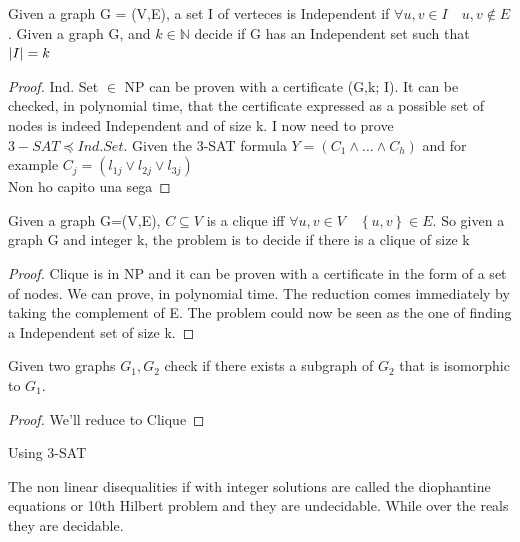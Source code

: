 \begin{proposition}
    Given a graph G = (V,E), a set I of verteces is Independent if 
    $\forall u,v \in I \quad {u,v} \notin E$. Given a graph G, and $k \in \mathbb{N}$ decide if G has an Independent set such that $\left\lvert I\right\rvert = k$
    \begin{proof}
        Ind. Set $\in$ NP can be proven with a certificate (G,k; I). It can be checked, in polynomial time, that the certificate expressed as a possible set of nodes is indeed Independent and of size k. I now need to prove $3-SAT \preceq Ind.Set$. Given the 3-SAT formula $Y  = (C_1 \wedge \ldots \wedge C_h)$ and for example $C_j = (l_{1j} \vee l_{2j} \vee l_{3j})$\\
        Non ho capito una sega
    \end{proof}
\end{proposition}

\begin{proposition}
    Given a graph G=(V,E), $C \subseteq V$ is a clique iff $\forall u,v \in V \quad \left\{ u,v \right\} \in E$. So given a graph G and integer k, the problem is to decide if there is a clique of size k
    \begin{proof}
        Clique is in NP and it can be proven with a certificate in the form of a set of nodes. We can prove, in polynomial time. The reduction comes immediately by taking the complement of E. The problem could now be seen as the one of finding a Independent set of size k. 
    \end{proof} 
\end{proposition}

\begin{proposition}
    Given two graphs $G_1, G_2$ check if there exists a subgraph of $G_2$ that is isomorphic to $G_1$.
    \begin{proof}
        We'll reduce to Clique 
    \end{proof}

\end{proposition}

\begin{proposition}
    Using 3-SAT
\end{proposition}
The non linear disequalities if with integer solutions are called the diophantine equations or 10th Hilbert problem and they are undecidable. While over the reals they are decidable.

